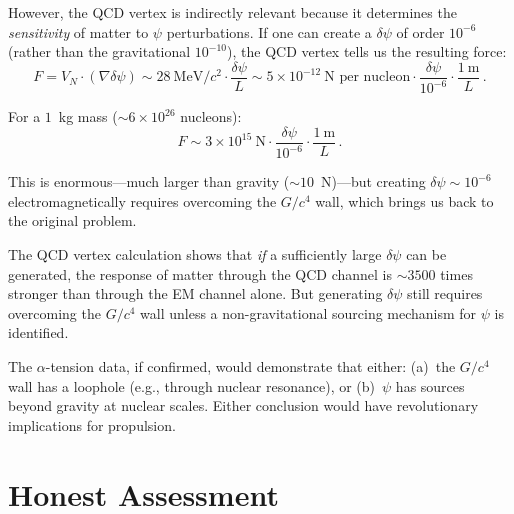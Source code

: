 \documentclass[aps,prd,twocolumn,superscriptaddress,floatfix,nofootinbib]{revtex4-2}
\newcommand{\dpsi}{\delta\psi}
\begin{document}
However, the QCD vertex is indirectly relevant because it determines the
\emph{sensitivity} of matter to $\psi$ perturbations. If one can create a
$\dpsi$ of order $10^{-6}$ (rather than the gravitational $10^{-10}$), the
QCD vertex tells us the resulting force:
\begin{equation}
F = V_N \cdot (\nabla\dpsi) \sim 28~\text{MeV}/c^2 \cdot \frac{\dpsi}{L}
\sim 5 \times 10^{-12}~\text{N per nucleon} \cdot
\frac{\dpsi}{10^{-6}} \cdot \frac{1~\text{m}}{L} \, .
\end{equation}

For a $1$~kg mass ($\sim 6 \times 10^{26}$ nucleons):
\begin{equation}
F \sim 3 \times 10^{15}~\text{N} \cdot \frac{\dpsi}{10^{-6}} \cdot
\frac{1~\text{m}}{L} \, .
\end{equation}

This is enormous---much larger than gravity ($\sim 10$~N)---but creating
$\dpsi \sim 10^{-6}$ electromagnetically requires overcoming the $G/c^4$
wall, which brings us back to the original problem.

\begin{tcolorbox}[colback=yellow!5!white, colframe=yellow!50!black,
  title=Propulsion Assessment]
The QCD vertex calculation shows that \emph{if} a sufficiently large
$\dpsi$ can be generated, the response of matter through the QCD channel
is $\sim 3500$ times stronger than through the EM channel alone. But
generating $\dpsi$ still requires overcoming the $G/c^4$ wall unless
a non-gravitational sourcing mechanism for $\psi$ is identified.

The $\alpha$-tension data, if confirmed, would demonstrate that either:
(a)~the $G/c^4$ wall has a loophole (e.g., through nuclear resonance), or
(b)~$\psi$ has sources beyond gravity at nuclear scales.
Either conclusion would have revolutionary implications for propulsion.
\end{tcolorbox}


\section{Honest Assessment}\label{sec:honest}

\end{document}
